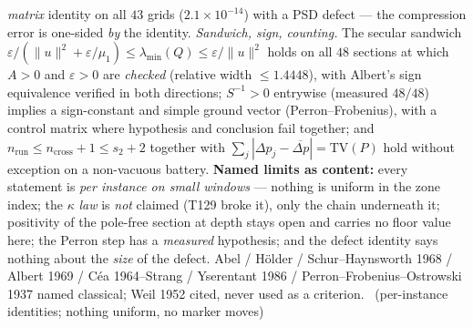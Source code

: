 \documentclass[11pt,a4paper]{article}
\theoremstyle{definition}
\begin{document}
\emph{matrix} identity on all $43$ grids ($2.1\times10^{-14}$) with a PSD defect
--- the compression error is one-sided \emph{by} the identity.
\emph{Sandwich, sign, counting.} The secular sandwich
$\varepsilon/(\|u\|^2+\varepsilon/\mu_1)\le\lambda_{\min}(Q)\le\varepsilon/\|u\|^2$
holds on all $48$ sections at which $A>0$ and $\varepsilon>0$ are \emph{checked}
(relative width $\le1.4448$), with Albert's sign equivalence verified in both
directions; $S^{-1}>0$ entrywise (measured $48/48$) implies a sign-constant and
simple ground vector (Perron--Frobenius), with a control matrix where hypothesis
and conclusion fail together; and
$n_{\mathrm{run}}\le n_{\mathrm{cross}}+1\le s_2+2$ together with
$\sum_j|\Delta p_j-\overline{\Delta p}|=\mathrm{TV}(P)$ hold without exception on
a non-vacuous battery.
\textbf{Named limits as content:} every statement is \emph{per instance on small
windows} --- nothing is uniform in the zone index; the $\kappa$ \emph{law} is
\emph{not} claimed (T129 broke it), only the chain underneath it; positivity of
the pole-free section at depth stays open and carries no floor value here; the
Perron step has a \emph{measured} hypothesis; and the defect identity says
nothing about the \emph{size} of the defect.
Abel / H\"older / Schur--Haynsworth 1968 / Albert 1969 / C\'ea 1964--Strang /
Yserentant 1986 / Perron--Frobenius--Ostrowski 1937 named classical; Weil 1952
cited, never used as a criterion.
\mE\ (per-instance identities; nothing uniform, no marker moves)
\end{document}
